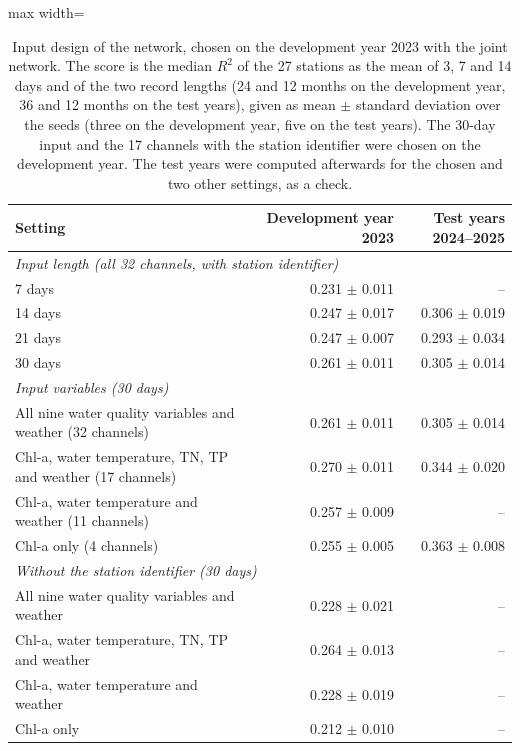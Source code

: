 \begin{table}[tbp]
\centering
\caption{Input design of the network, chosen on the development year 2023 with the joint network. The score is the median $R^2$ of the 27 stations as the mean of 3, 7 and 14 days and of the two record lengths (24 and 12 months on the development year, 36 and 12 months on the test years), given as mean $\pm$ standard deviation over the seeds (three on the development year, five on the test years). The 30-day input and the 17 channels with the station identifier were chosen on the development year. The test years were computed afterwards for the chosen and two other settings, as a check.}
\label{tab:S_input}
\footnotesize
\setlength{\tabcolsep}{3.5pt}
\begin{adjustbox}{max width=\textwidth}
\begin{tabular}{lrr}
\toprule
Setting & Development year 2023 & Test years 2024--2025 \\
\midrule
\multicolumn{3}{l}{\textit{Input length (all 32 channels, with station identifier)}} \\
7 days & 0.231 $\pm$ 0.011 & -- \\
14 days & 0.247 $\pm$ 0.017 & 0.306 $\pm$ 0.019 \\
21 days & 0.247 $\pm$ 0.007 & 0.293 $\pm$ 0.034 \\
30 days & 0.261 $\pm$ 0.011 & 0.305 $\pm$ 0.014 \\
\midrule
\multicolumn{3}{l}{\textit{Input variables (30 days)}} \\
All nine water quality variables and weather (32 channels) & 0.261 $\pm$ 0.011 & 0.305 $\pm$ 0.014 \\
Chl-a, water temperature, TN, TP and weather (17 channels) & 0.270 $\pm$ 0.011 & 0.344 $\pm$ 0.020 \\
Chl-a, water temperature and weather (11 channels) & 0.257 $\pm$ 0.009 & -- \\
Chl-a only (4 channels) & 0.255 $\pm$ 0.005 & 0.363 $\pm$ 0.008 \\
\midrule
\multicolumn{3}{l}{\textit{Without the station identifier (30 days)}} \\
All nine water quality variables and weather & 0.228 $\pm$ 0.021 & -- \\
Chl-a, water temperature, TN, TP and weather & 0.264 $\pm$ 0.013 & -- \\
Chl-a, water temperature and weather & 0.228 $\pm$ 0.019 & -- \\
Chl-a only & 0.212 $\pm$ 0.010 & -- \\
\bottomrule
\end{tabular}
\end{adjustbox}
\end{table}
